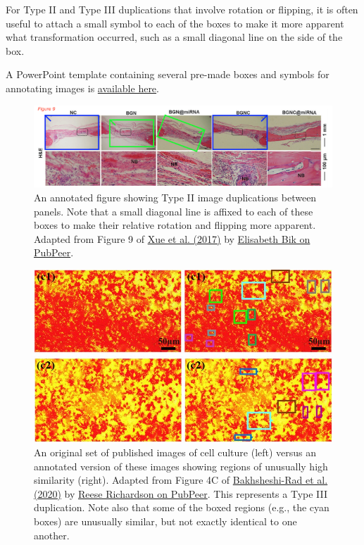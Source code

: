 \documentclass[letterpaper, 12pt]{article}
\begin{document}
For Type II and Type III duplications that involve rotation or flipping, it is often useful to attach a small symbol to each of the boxes to make it more apparent what transformation occurred, such as a small diagonal line on the side of the box. 

A PowerPoint template containing several pre-made boxes and symbols for annotating images is \href{https://osf.io/w3epj}{available here}.
\begin{figure}[h!tbp]
    \centering
    \includegraphics[width=\textwidth]{img/image_duplication/xue_fig_9_small.png}
    \caption*{An annotated figure showing Type II image duplications between panels. Note that a small diagonal line is affixed to each of these boxes to make their relative rotation and flipping more apparent. Adapted from Figure 9 of \href{https://doi.org/10.1002/adhm.201700630}{Xue et al. (2017)} by \href{https://pubpeer.com/publications/C47278BACD8304A719E502DF7041A5\#1}{Elisabeth Bik on PubPeer}.}
\end{figure}

\begin{figure}[h!tbp]
    \centering
    \includegraphics[width=\textwidth]{img/image_duplication/Bakhsheshi-Rad_annotation.jpg}
    \caption*{An original set of published images of cell culture (left) versus an annotated version of these images showing regions of unusually high similarity (right). Adapted from Figure 4C of \href{https://doi.org/10.1016/j.polymertesting.2019.106298}{Bakhsheshi-Rad et al. (2020)} by \href{https://pubpeer.com/publications/60A225978670EFD93446CAC5696F7F\#1}{Reese Richardson on PubPeer}. This represents a Type III duplication. Note also that some of the boxed regions (e.g., the cyan boxes) are unusually similar, but not exactly identical to one another.}
\end{figure}
\end{document}
